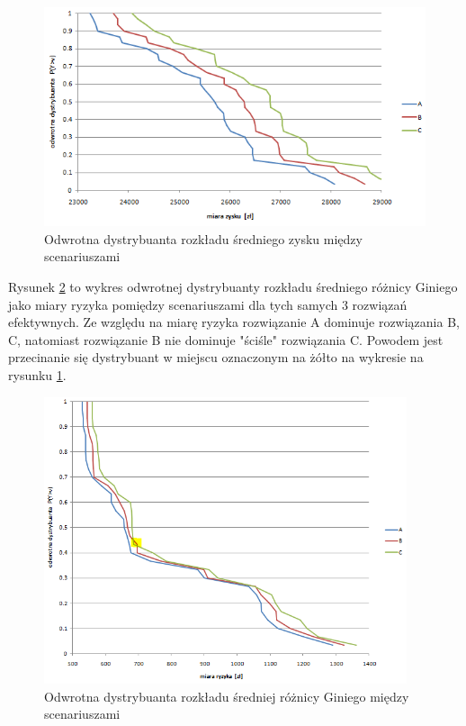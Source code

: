 \documentclass[11pt,a4paper]{article}
\begin{document}
\begin{figure}[ht!]
\centering
\includegraphics[width=\textwidth]{graphics/results-FSD-profit}
\caption{Odwrotna dystrybuanta rozkładu średniego zysku między scenariuszami}
\label{fig:FSD-profit}
\end{figure}

Rysunek \ref{fig:FSD-risk} to wykres odwrotnej dystrybuanty rozkładu średniego różnicy Giniego jako miary ryzyka pomiędzy scenariuszami dla tych samych 3 rozwiązań efektywnych. Ze względu na miarę ryzyka rozwiązanie A dominuje rozwiązania B, C, natomiast rozwiązanie B nie dominuje "ściśle" rozwiązania C. Powodem jest przecinanie się dystrybuant w miejscu oznaczonym na żółto na wykresie na rysunku \ref{fig:FSD-profit}.

\begin{figure}[ht!]
\centering
\includegraphics[width=0.95\textwidth]{graphics/results-FSD-risk}
\caption{Odwrotna dystrybuanta rozkładu średniej różnicy Giniego między scenariuszami}
\label{fig:FSD-risk}
\end{figure}
\end{document}

